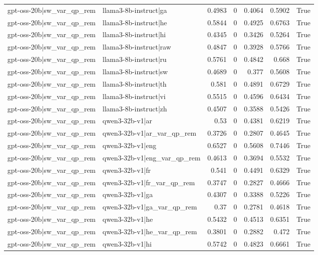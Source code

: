 \begin{table}
\begin{tabular}{l l r r r r l}
gpt-oss-20b|sw_var_qp_rem & llama3-8b-instruct|ga & 0.4983 & 0 & 0.4064 & 0.5902 & True \\
gpt-oss-20b|sw_var_qp_rem & llama3-8b-instruct|he & 0.5844 & 0 & 0.4925 & 0.6763 & True \\
gpt-oss-20b|sw_var_qp_rem & llama3-8b-instruct|hi & 0.4345 & 0 & 0.3426 & 0.5264 & True \\
gpt-oss-20b|sw_var_qp_rem & llama3-8b-instruct|raw & 0.4847 & 0 & 0.3928 & 0.5766 & True \\
gpt-oss-20b|sw_var_qp_rem & llama3-8b-instruct|ru & 0.5761 & 0 & 0.4842 & 0.668 & True \\
gpt-oss-20b|sw_var_qp_rem & llama3-8b-instruct|sw & 0.4689 & 0 & 0.377 & 0.5608 & True \\
gpt-oss-20b|sw_var_qp_rem & llama3-8b-instruct|th & 0.581 & 0 & 0.4891 & 0.6729 & True \\
gpt-oss-20b|sw_var_qp_rem & llama3-8b-instruct|vi & 0.5515 & 0 & 0.4596 & 0.6434 & True \\
gpt-oss-20b|sw_var_qp_rem & llama3-8b-instruct|zh & 0.4507 & 0 & 0.3588 & 0.5426 & True \\
gpt-oss-20b|sw_var_qp_rem & qwen3-32b-v1|ar & 0.53 & 0 & 0.4381 & 0.6219 & True \\
gpt-oss-20b|sw_var_qp_rem & qwen3-32b-v1|ar_var_qp_rem & 0.3726 & 0 & 0.2807 & 0.4645 & True \\
gpt-oss-20b|sw_var_qp_rem & qwen3-32b-v1|eng & 0.6527 & 0 & 0.5608 & 0.7446 & True \\
gpt-oss-20b|sw_var_qp_rem & qwen3-32b-v1|eng_var_qp_rem & 0.4613 & 0 & 0.3694 & 0.5532 & True \\
gpt-oss-20b|sw_var_qp_rem & qwen3-32b-v1|fr & 0.541 & 0 & 0.4491 & 0.6329 & True \\
gpt-oss-20b|sw_var_qp_rem & qwen3-32b-v1|fr_var_qp_rem & 0.3747 & 0 & 0.2827 & 0.4666 & True \\
gpt-oss-20b|sw_var_qp_rem & qwen3-32b-v1|ga & 0.4307 & 0 & 0.3388 & 0.5226 & True \\
gpt-oss-20b|sw_var_qp_rem & qwen3-32b-v1|ga_var_qp_rem & 0.37 & 0 & 0.2781 & 0.4618 & True \\
gpt-oss-20b|sw_var_qp_rem & qwen3-32b-v1|he & 0.5432 & 0 & 0.4513 & 0.6351 & True \\
gpt-oss-20b|sw_var_qp_rem & qwen3-32b-v1|he_var_qp_rem & 0.3801 & 0 & 0.2882 & 0.472 & True \\
gpt-oss-20b|sw_var_qp_rem & qwen3-32b-v1|hi & 0.5742 & 0 & 0.4823 & 0.6661 & True \\

\end{tabular}
\end{table}
